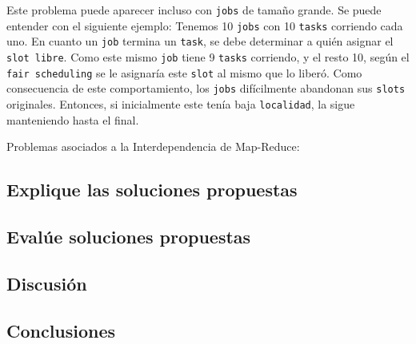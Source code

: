\documentclass[11pt, a4paper, twoside]{article}
\begin{document}
Este problema puede aparecer incluso con \texttt{jobs} de tamaño grande. Se
puede entender con el siguiente ejemplo: Tenemos 10 \texttt{jobs} con 10
\texttt{tasks} corriendo cada uno. En cuanto un \texttt{job} termina un
\texttt{task}, se debe determinar a quién asignar el \texttt{slot libre}. Como
este mismo \texttt{job} tiene 9 \texttt{tasks} corriendo, y el resto 10, según
el \texttt{fair scheduling} se le asignaría este \texttt{slot} al mismo que lo
liberó. Como consecuencia de este comportamiento, los \texttt{jobs} difícilmente
abandonan sus \texttt{slots} originales. Entonces, si inicialmente este tenía
baja \texttt{localidad}, la sigue manteniendo hasta el final.

Problemas asociados a la Interdependencia de Map-Reduce:


\clearpage
\subsection {\footnotesize Explique las soluciones propuestas}
\label{investigacion-6}

\clearpage
\subsection {\footnotesize Evalúe soluciones propuestas}
\label{investigacion-7}

\clearpage
\subsection {\footnotesize Discusión}
\label{investigacion-8}

\clearpage
\subsection {\footnotesize Conclusiones}
\label{investigacion-9}

\clearpage
\end{document}
